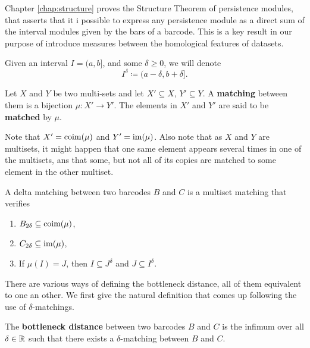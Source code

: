 Chapter \ref{chap:structure} proves the Structure Theorem of persistence modules, that asserts that it i possible to express any persistence module as a direct sum of the interval modules given by the bars of a barcode. This is a key result in our purpose of introduce measures between the homological features of datasets. 

Given an interval $ I = (a, b]$, and some $ \delta \geq 0 $, we will denote
\begin{equation}
    I^\delta \coloneq (a-\delta, b+\delta].
\end{equation}

\begin{definition}
    Let $ X $ and $ Y $ be two multi-sets and let $ X' \subseteq X $, $ Y' \subseteq Y$. A {\bf matching} between them is a bijection $ \mu \colon X' \to Y' $. The elements in $ X' $ and $ Y' $ are said to be {\bf matched} by $ \mu $.
\end{definition}

Note that $ X' = \operatorname{coim}(\mu) $ and $ Y' = \operatorname{im}(\mu) $. Also note that as $ X $ and $ Y $ are multisets, it might happen that one same element appears several times in one of the multisets, ans that some, but not all of its copies are matched to some element in the other multiset. 

\begin{definition} \label{delta-matching}
    A delta matching between two barcodes $ B $ and $ C $ is a multiset matching that verifies
    \begin{enumerate}
        \item $B_{2\delta} \subseteq \operatorname{coim}(\mu) $,
        \item $C_{2\delta} \subseteq \operatorname{im}(\mu) $,
        \item If $\mu(I) = J$, then $I \subseteq J^\delta$ and $J \subseteq I^\delta$.
    \end{enumerate}
\end{definition}

There are various ways of defining the bottleneck distance, all of them equivalent to one an other. We first give the natural definition that comes up following the use of $\delta$-matchings.

\begin{definition} \label{def:bot-dist}
    The {\bf bottleneck distance} between two barcodes $ B $ and $ C $ is the infimum over all $ \delta \in \mathbb R $ such that there exists a $\delta$-matching between $ B $ and $ C $.
\end{definition}

